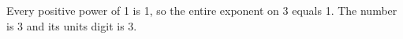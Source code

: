 Every positive power of 1 is 1, so the entire exponent on 3 equals 1. The number is 3 and its units digit is $\boxed3 $.
